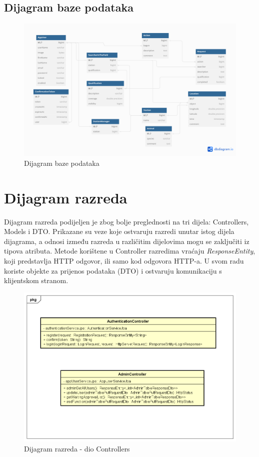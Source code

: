 			\subsection{Dijagram baze podataka}
				\begin{figure}[H]
					\includegraphics[scale=0.35]{dijagrami/dijagram_baze_podataka.png}
					\centering
					\caption{Dijagram baze podataka}
					\label{fig:promjene}
				\end{figure}
			\eject
			
			
		\section{Dijagram razreda}
		Dijagram razreda podijeljen je zbog bolje preglednosti na tri dijela: Controllers, Models i DTO. Prikazane su veze koje ostvaruju razredi unutar istog dijela dijagrama, a odnosi između razreda u različitim dijelovima mogu se zaključiti iz tipova atributa. Metode korištene u Controller razredima vraćaju \textit{ResponseEntity}, koji predstavlja HTTP odgovor, ili samo kod odgovora HTTP-a. U svom radu koriste objekte za prijenos podataka (DTO) i ostvaruju komunikaciju s klijentskom stranom.
			
			\begin{figure}[H]
				\includegraphics[scale=0.5]{dijagrami/Controllers.png} 
				\centering
				\caption{Dijagram razreda - dio Controllers}
				\label{fig:promjene}
			\end{figure}
			
